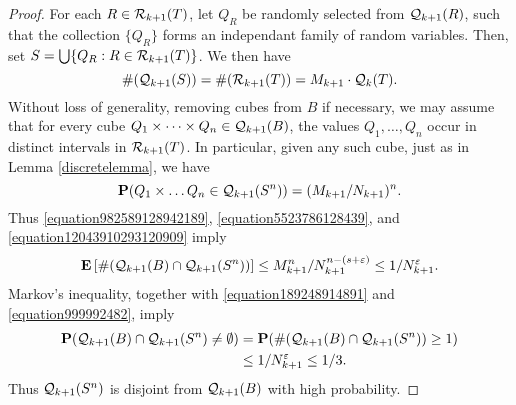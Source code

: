 \begin{proof}
    For each $R \in \operatorname{\mathcal{R}}_{k+1}(T)$, let $Q_R$ be randomly selected from $\operatorname{\mathcal{Q}}_{k+1}(R)$, such that the collection $\{ Q_R \}$ forms an independant family of random variables. Then, set $S = \bigcup \{ Q_R: R \in \operatorname{\mathcal{R}}_{k+1}(T) \}$. We then have
    \begin{equation} \label{equation6900921094190290}
        \#(\operatorname{\mathcal{Q}}_{k+1}(S)) = \#(\operatorname{\mathcal{R}}_{k+1}(T)) = M_{k+1} \cdot \operatorname{\mathcal{Q}}_k(T).
    \end{equation}
    Without loss of generality, removing cubes from $B$ if necessary, we may assume that for every cube $Q_1 \times \dots \times Q_n \in \operatorname{\mathcal{Q}}_{k+1}(B)$, the values $Q_1, \dots, Q_n$ occur in distinct intervals in $\operatorname{\mathcal{R}}_{k+1}(T)$. In particular, given any such cube, just as in Lemma \ref{discretelemma}, we have
    \begin{equation} \label{equation12043910293120909}
        \mathbf{P}(Q_1 \times \dots Q_n \in \operatorname{\mathcal{Q}}_{k+1}(S^n)) = (M_{k+1}/N_{k+1})^n.
    \end{equation}
    Thus \eqref{equation982589128942189}, \eqref{equation5523786128439}, and \eqref{equation12043910293120909} imply
    \begin{equation} \label{equation999992482}
        \mathbf{E} \left[ \#(\operatorname{\mathcal{Q}}_{k+1}(B) \cap \operatorname{\mathcal{Q}}_{k+1}(S^n)) \right] \leq M_{k+1}^n/N_{k+1}^{n - (s + \varepsilon)} \leq 1/N_{k+1}^\varepsilon.
    \end{equation}
    Markov's inequality, together with \eqref{equation189248914891} and \eqref{equation999992482}, imply
    \begin{equation} \label{fourierdim2}
    \begin{split}
        \mathbf{P}(\operatorname{\mathcal{Q}}_{k+1}(B) \cap \operatorname{\mathcal{Q}}_{k+1}(S^n) \neq \emptyset) &= \mathbf{P}(\# (\operatorname{\mathcal{Q}}_{k+1}(B) \cap \operatorname{\mathcal{Q}}_{k+1}(S^n)) \geq 1)\\
        &\leq 1/N_{k+1}^\varepsilon \leq 1/3.
    \end{split}
    \end{equation}
    Thus $\operatorname{\mathcal{Q}}_{k+1}(S^n)$ is disjoint from $\operatorname{\mathcal{Q}}_{k+1}(B)$ with high probability.


\end{proof}
